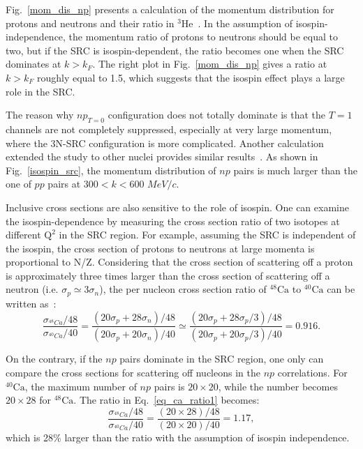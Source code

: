 Fig.~\ref{mom_dis_np} presents a calculation of the momentum distribution for protons and neutrons and their ratio in $\mathrm{^{3}He}$~\cite{Pieper_Wiringa}. In the assumption of isospin-independence, the momentum ratio of protons to neutrons should be equal to two, but if the SRC is isospin-dependent, the ratio becomes one when the SRC dominates at $k>k_{F}$. The right plot in Fig.~\ref{mom_dis_np} gives a ratio at $k>k_{F}$ roughly equal to 1.5, which suggests that the isospin effect plays a large role in the SRC.

 The reason why $np_{T=0}$ configuration does not totally dominate is that the $T=1$ channels are not completely suppressed, especially at very large momentum, where the 3N-SRC configuration is more complicated. Another calculation extended the study to other nuclei provides similar results~\cite{PhysRevLett.98.132501}. As shown in Fig.~\ref{isospin_src}, the momentum distribution of $np$ pairs is much larger than the one of $pp$ pairs at $300<k<600$ $MeV/c$.

 Inclusive cross sections are also sensitive to the role of isospin. One can examine the isospin-dependence by measuring the cross section ratio of two isotopes at different $\mathrm{Q^{2}}$ in the SRC region. For example, assuming the SRC is independent of the isospin, the cross section of protons to neutrons at large momenta is proportional to N/Z. Considering that the cross section of scattering off a proton is approximately three times larger than the cross section of scattering off a neutron (i.e. $\sigma_{p}\simeq 3\sigma_{n}$), the per nucleon cross section ratio of $\mathrm{^{48}Ca}$ to $\mathrm{^{40}Ca}$ can be written as~\cite{e08014_pr}:
 \begin{equation}
  \frac{\sigma_{^{48}Ca}/48}{\sigma_{^{40}Ca}/40}=\frac{\left(20\sigma_{p}+28\sigma_{n}\right)/48}{\left(20\sigma_{p}+20\sigma_{n}\right)/40}\simeq\frac{\left(20\sigma_{p}+28\sigma_{p}/3\right)/48}{\left(20\sigma_{p}+20\sigma_{p}/3\right)/40}=0.916.
  \label{eq_ca_ratio1}
 \end{equation}

 On the contrary, if the $np$ pairs dominate in the SRC region, one only can compare the cross sections for scattering off nucleons in the $np$ correlations. For $\mathrm{^{40}Ca}$, the maximum number of $np$ pairs is $\mathrm{20\times 20}$, while the number becomes $\mathrm{20\times 28}$ for $\mathrm{^{48}Ca}$. The ratio in Eq.~\eqref{eq_ca_ratio1} becomes:
 \begin{equation}
  \frac{\sigma_{^{48}Ca}/48}{\sigma_{^{40}Ca}/40}=\frac{\left(20\times 28\right)/48}{\left(20\times 20\right)/40}=1.17,
  \label{eq_ca_ratio2}
 \end{equation} 
which is 28\% larger than the ratio with the assumption of isospin independence. 

